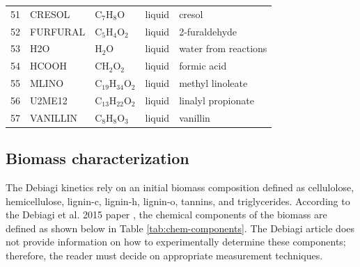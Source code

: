 \begin{center}
\begin{longtable}{cllll}
        51 & CRESOL         & C$_7$H$_8$O             & \cellcolor{blue!25}liquid        & cresol \\
        52 & FURFURAL       & C$_5$H$_4$O$_2$         & \cellcolor{blue!25}liquid        & 2-furaldehyde \\
        53 & H2O            & H$_2$O                  & \cellcolor{blue!25}liquid        & water from reactions \\
        54 & HCOOH          & CH$_2$O$_2$             & \cellcolor{blue!25}liquid        & formic acid \\
        55 & MLINO          & C$_{19}$H$_{34}$O$_2$   & \cellcolor{blue!25}liquid        & methyl linoleate \\
        56 & U2ME12         & C$_{13}$H$_{22}$O$_2$   & \cellcolor{blue!25}liquid        & linalyl propionate \\
        57 & VANILLIN       & C$_8$H$_8$O$_3$         & \cellcolor{blue!25}liquid        & vanillin \\
        \bottomrule
    \end{longtable}
\end{center}

\subsection{Biomass characterization}

The Debiagi kinetics rely on an initial biomass composition defined as cellulolose, hemicellulose, lignin-c, lignin-h, lignin-o, tannins, and triglycerides. According to the Debiagi et al. 2015 paper \cite{Debiagi-2015}, the chemical components of the biomass are defined as shown below in Table \ref{tab:chem-components}. The Debiagi article does not provide information on how to experimentally determine these components; therefore, the reader must decide on appropriate measurement techniques.

